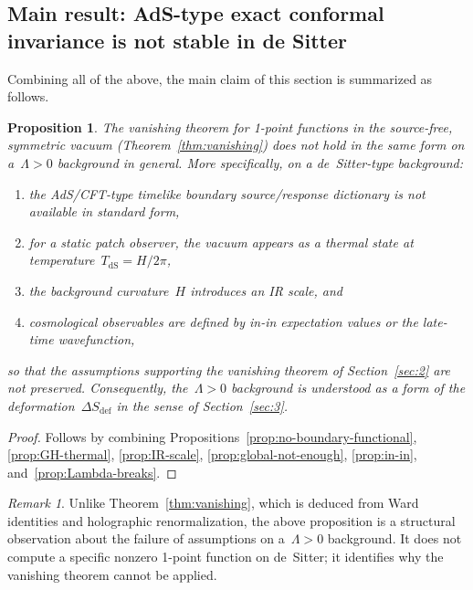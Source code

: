 \documentclass[
  aps,
  prd,
  preprint,
  groupedaddress,
  nofootinbib,
  longbibliography
]{revtex4-2}
\newtheorem{proposition}[definition]{Proposition}
\theoremstyle{remark}
\newtheorem{remark}[definition]{Remark}
\newcommand{\dS}{\mathrm{dS}}
\begin{document}
\subsection{Main result: AdS-type exact conformal invariance is
  not stable in de Sitter}\label{subsec:4-7}

Combining all of the above, the main claim of this section is
summarized as follows.

\begin{proposition}\label{thm:lambda}
The vanishing theorem for 1-point functions in
the source-free, symmetric vacuum
(Theorem~\ref{thm:vanishing}) does not hold
in the same form on a~$\Lambda>0$ background in general.
More specifically, on a de~Sitter-type background:
\begin{enumerate}
\item the AdS/CFT-type timelike boundary source/response dictionary
  is not available in standard form,
\item for a static patch observer, the vacuum appears as a thermal
  state at temperature~$T_{\dS}=H/2\pi$,
\item the background curvature~$H$ introduces an IR scale, and
\item cosmological observables are defined by in-in expectation
  values or the late-time wavefunction,
\end{enumerate}
so that the assumptions supporting the vanishing theorem of
Section~\ref{sec:2} are not preserved.
Consequently, the~$\Lambda>0$ background is understood as a form
of the deformation~$\Delta S_{\mathrm{def}}$ in the sense of
Section~\ref{sec:3}.
\end{proposition}

\begin{proof}
Follows by combining
Propositions~\ref{prop:no-boundary-functional},
\ref{prop:GH-thermal},
\ref{prop:IR-scale},
\ref{prop:global-not-enough},
\ref{prop:in-in},
and~\ref{prop:Lambda-breaks}.
\end{proof}

\begin{remark}\label{rem:lambda-status}
Unlike Theorem~\ref{thm:vanishing}, which is deduced from Ward
identities and holographic renormalization, the above proposition
is a structural observation about the failure of assumptions
on a~$\Lambda>0$ background.
It does not compute a specific nonzero 1-point function on
de~Sitter; it identifies why the vanishing theorem cannot be
applied.
\end{remark}
\end{document}
